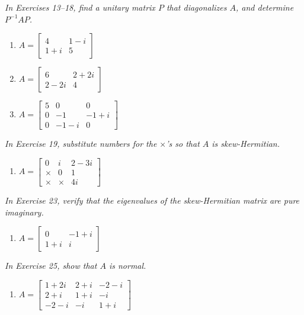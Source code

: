 \documentclass{article}
\begin{document}
\noindent\textit{In Exercises 13--18, find a unitary matrix $P$ that diagonalizes $A$, and determine $P^{-1}AP$.}

\begin{enumerate}
  \item[(13)] $A = \begin{bmatrix} 4 & 1-i \\ 1+i & 5 \end{bmatrix}$

  \item[(15)] $A = \begin{bmatrix} 6 & 2+2i \\ 2-2i & 4 \end{bmatrix}$

  \item[(17)] $A = \begin{bmatrix} 5 & 0 & 0 \\ 0 & -1 & -1+i \\ 0 & -1-i & 0 \end{bmatrix}$
\end{enumerate}

\noindent\textit{In Exercise 19, substitute numbers for the $\times$'s so that $A$ is skew-Hermitian.}

\begin{enumerate}
  \item[(19)] $A = \begin{bmatrix} 0 & i & 2-3i \\ \times & 0 & 1 \\ \times & \times & 4i \end{bmatrix}$
\end{enumerate}

\noindent\textit{In Exercise 23, verify that the eigenvalues of the skew-Hermitian matrix are pure imaginary.}

\begin{enumerate}
  \item[(23)] $A = \begin{bmatrix} 0 & -1+i \\ 1+i & i \end{bmatrix}$
\end{enumerate}

\noindent\textit{In Exercise 25, show that $A$ is normal.}

\begin{enumerate}
  \item[(25)] $A = \begin{bmatrix} 1+2i & 2+i & -2-i \\ 2+i & 1+i & -i \\ -2-i & -i & 1+i \end{bmatrix}$
\end{enumerate}
\end{document}
